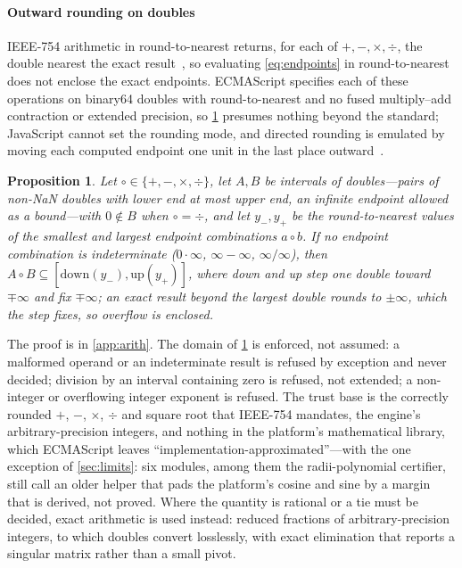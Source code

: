 \documentclass[preprint,11pt,a4paper]{elsarticle}
\newtheorem{proposition}{Proposition}
\theoremstyle{definition}
\begin{document}
\paragraph{Outward rounding on doubles}\label{sec:arith}
IEEE-754 arithmetic in round-to-nearest returns, for each of $+,-,\times,\div$, the double nearest the exact result~\citep{IEEE754,Goldberg91,Muller18}, so evaluating \cref{eq:endpoints} in round-to-nearest does not enclose the exact endpoints. ECMAScript specifies each of these operations on binary64 doubles with round-to-nearest and no fused multiply--add contraction or extended precision, so \cref{prop:outward} presumes nothing beyond the standard; JavaScript cannot set the rounding mode, and directed rounding is emulated by moving each computed endpoint one unit in the last place outward~\citep{Rump09,Rump16fixed}.

\begin{proposition}\label{prop:outward}
Let $\circ\in\{+,-,\times,\div\}$, let $A,B$ be intervals of doubles---pairs of non-NaN doubles with lower end at most upper end, an infinite endpoint allowed as a bound---with $0\notin B$ when $\circ=\div$, and let $y_-,y_+$ be the round-to-nearest values of the smallest and largest endpoint combinations $a\circ b$. If no endpoint combination is indeterminate ($0\cdot\infty$, $\infty-\infty$, $\infty/\infty$), then $A\circ B\subseteq[\mathrm{down}(y_-),\mathrm{up}(y_+)]$, where down and up step one double toward $\mp\infty$ and fix $\mp\infty$; an exact result beyond the largest double rounds to $\pm\infty$, which the step fixes, so overflow is enclosed.
\end{proposition}
The proof is in \ref{app:arith}. The domain of \cref{prop:outward} is enforced, not assumed: a malformed operand or an indeterminate result is refused by exception and never decided; division by an interval containing zero is refused, not extended; a non-integer or overflowing integer exponent is refused. The trust base is the correctly rounded $+$, $-$, $\times$, $\div$ and square root that IEEE-754 mandates, the engine's arbitrary-precision integers, and nothing in the platform's mathematical library, which ECMAScript leaves ``implementation-approximated''---with the one exception of \cref{sec:limits}: six modules, among them the radii-polynomial certifier, still call an older helper that pads the platform's cosine and sine by a margin that is derived, not proved. Where the quantity is rational or a tie must be decided, exact arithmetic is used instead: reduced fractions of arbitrary-precision integers, to which doubles convert losslessly, with exact elimination that reports a singular matrix rather than a small pivot.
\end{document}
